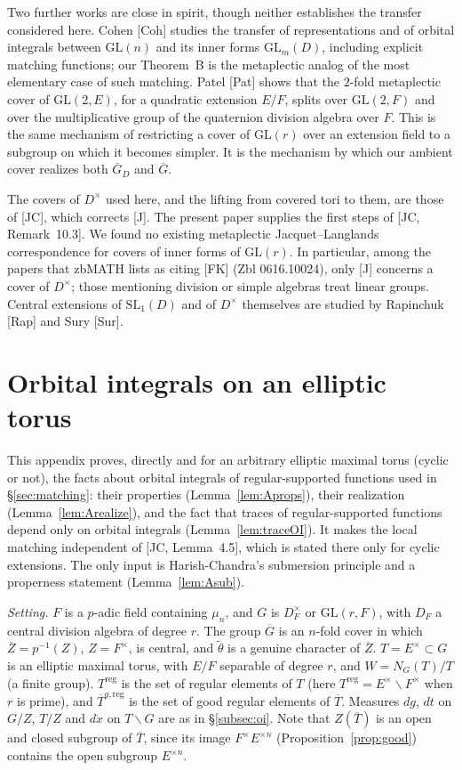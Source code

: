 \documentclass[12pt]{article}
\newcommand{\ov}[1]{\overline{#1}}
\newcommand{\reg}{\mathrm{reg}}
\newcommand{\GL}{\mathrm{GL}}
\newcommand{\Gb}{\ov{G}}
\newcommand{\Zb}{\ov{Z}}
\newcommand{\GDb}{\ov{G}_D}
\newcommand{\Tb}{\ov{T}}
\theoremstyle{plain}
\theoremstyle{definition}
\begin{document}
Two further works are close in spirit, though neither establishes the transfer considered here. Cohen [Coh] studies the transfer of representations and of orbital integrals between $\GL(n)$ and its inner forms $\GL_m(D)$, including explicit matching functions; our Theorem~B is the metaplectic analog of the most elementary case of such matching. Patel [Pat] shows that the $2$-fold metaplectic cover of $\GL(2,E)$, for a quadratic extension $E/F$, splits over $\GL(2,F)$ and over the multiplicative group of the quaternion division algebra over $F$. This is the same mechanism of restricting a cover of $\GL(r)$ over an extension field to a subgroup on which it becomes simpler. It is the mechanism by which our ambient cover realizes both $\GDb$ and $\Gb$.

The covers of $D^\times$ used here, and the lifting from covered tori to them, are those of [JC], which corrects [J]. The present paper supplies the first steps of [JC, Remark~10.3]. We found no existing metaplectic Jacquet--Langlands correspondence for covers of inner forms of $\GL(r)$. In particular, among the papers that zbMATH lists as citing [FK] (Zbl 0616.10024), only [J] concerns a cover of $D^\times$; those mentioning division or simple algebras treat linear groups. Central extensions of $\mathrm{SL}_1(D)$ and of $D^\times$ themselves are studied by Rapinchuk [Rap] and Sury [Sur].

\appendix
\section{Orbital integrals on an elliptic torus}\label{app:oi}
This appendix proves, directly and for an arbitrary elliptic maximal torus (cyclic or not), the facts about orbital integrals of regular-supported functions used in \S\ref{sec:matching}: their properties (Lemma~\ref{lem:Aprops}), their realization (Lemma~\ref{lem:Arealize}), and the fact that traces of regular-supported functions depend only on orbital integrals (Lemma~\ref{lem:traceOI}). It makes the local matching independent of [JC, Lemma~4.5], which is stated there only for cyclic extensions. The only input is Harish-Chandra's submersion principle and a properness statement (Lemma~\ref{lem:Asub}).

\emph{Setting.} $F$ is a $p$-adic field containing $\mu_n$, and $G$ is $D_F^\times$ or $\GL(r,F)$, with $D_F$ a central division algebra of degree $r$. The group $\Gb$ is an $n$-fold cover in which $\Zb=p^{-1}(Z)$, $Z=F^\times$, is central, and $\tilde\theta$ is a genuine character of $\Zb$. $T=E^\times\subset G$ is an elliptic maximal torus, with $E/F$ separable of degree $r$, and $W=N_G(T)/T$ (a finite group). $T^{\reg}$ is the set of regular elements of $T$ (here $T^{\reg}=E^\times\smallsetminus F^\times$ when $r$ is prime), and $\Tb^{g,\reg}$ is the set of good regular elements of $\Tb$. Measures $dg$, $dt$ on $G/Z$, $T/Z$ and $d\dot x$ on $T\backslash G$ are as in \S\ref{subsec:oi}. Note that $Z(\Tb)$ is an open and closed subgroup of $\Tb$, since its image $F^\times E^{\times n}$ (Proposition~\ref{prop:good}) contains the open subgroup $E^{\times n}$.
\end{document}
